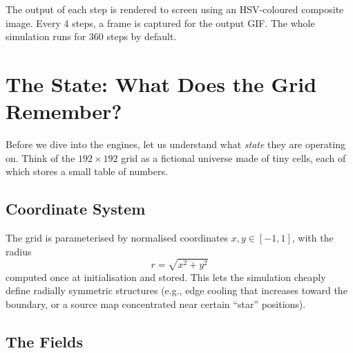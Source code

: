\documentclass[12pt,a4paper]{article}
\begin{document}
The output of each step is rendered to screen using an
HSV-coloured composite image.
Every 4 steps, a frame is captured for the output GIF.
The whole simulation runs for 360 steps by default.

\section{The State: What Does the Grid Remember?}

Before we dive into the engines, let us understand what
\emph{state} they are operating on.
Think of the $192 \times 192$ grid as a fictional universe
made of tiny cells, each of which stores a small table
of numbers.

\subsection{Coordinate System}

The grid is parameterised by normalised coordinates
$x, y \in [-1, 1]$, with the radius
\[
  r = \sqrt{x^2 + y^2}
\]
computed once at initialisation and stored.
This lets the simulation cheaply define radially
symmetric structures (e.g., edge cooling that increases toward the
boundary, or a source map concentrated near certain
``star'' positions).

\subsection{The Fields}
\end{document}
